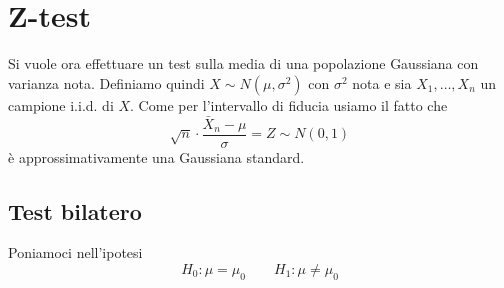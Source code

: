 \section{Z-test}\label{sec: z-test}
Si vuole ora effettuare un test sulla media di una popolazione Gaussiana con varianza nota.
Definiamo quindi $X \sim N(\mu, \sigma^2)$ con $\sigma^2$ nota e sia $X_1, \dots, X_n$ un campione
i.i.d. di $X$. Come per l'intervallo di fiducia usiamo il fatto che
\[ \sqrt{n} \cdot \frac{\bar{X}_n - \mu}{\sigma} = Z \sim N(0,1) \]
è approssimativamente una Gaussiana standard.

\subsection{Test bilatero}
Poniamoci nell'ipotesi
\[ H_0: \mu = \mu_0 \qquad H_1: \mu \neq \mu_0 \]

